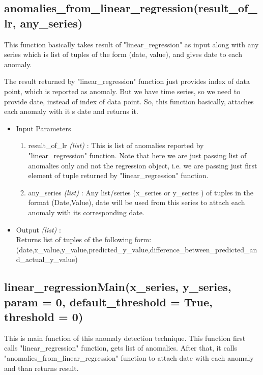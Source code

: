 \subsection{anomalies\_from\_linear\_regression(result\_of\_lr, any\_series)}

This function basically takes result of "linear\_regression" as input along with any series which is list of tuples of the form (date, value), and gives date to each anomaly. 

The result returned by "linear\_regression" function just provides index of data point, which is reported as anomaly. But we have time series, so we need to provide date, instead of index of data point. So, this function basically, attaches each anomaly with it s date and returns it.

\begin{itemize}
 \item Input Parameters
 
 \begin{enumerate}
  \item result\_of\_lr \textit{(list)} : This is list of anomalies reported by "linear\_regression" function. Note that here we are just passing list of anomalies only and not the regression object, i.e. we are passing just first element of tuple returned by "linear\_regression" function.
  \item any\_series \textit{(list)} : Any list/series (x\_series or y\_series ) of tuples in the format (Date,Value), date will be used from this series to attach each anomaly with its corresponding date.
 \end{enumerate}

 \item Output \textit{(list)} : \\
 	Returns list of tuples of the following form: \\ 
 	(date,x\_value,y\_value,predicted\_y\_value,difference\_between\_predicted\_and\_actual\_y\_value)

\end{itemize}

\subsection{linear\_regressionMain(x\_series, y\_series, param = 0, default\_threshold = True, threshold = 0)}

This is main function of this anomaly detection technique. This function first calls "linear\_regression" function, gets list of anomalies. After that, it calls "anomalies\_from\_linear\_regression" function to attach date with each anomaly and than returns result.

